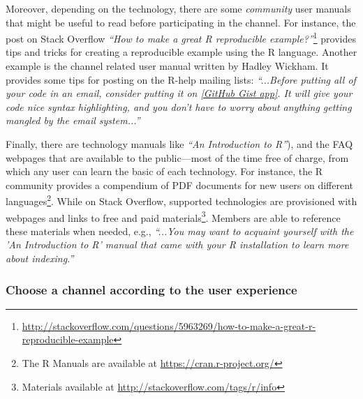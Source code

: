 \documentclass{sig-alternate-05-2015}
\begin{document}
		Moreover, depending on the technology, there are some \textit{community} user manuals that might be useful to read before participating in the channel.
		For instance, the post on Stack Overflow \textit{``How to make a great R reproducible example?''}\footnote{\url{http://stackoverflow.com/questions/5963269/how-to-make-a-great-r-reproducible-example}} provides tips and tricks for creating a reproducible example using the R language.
	 	Another example is the channel related user manual written by Hadley Wickham.
	 	It provides some tips for posting on the R-help mailing lists: \textit{``...Before putting all of your code in an email, consider putting it on \href{http://gist.github.com/}{[GitHub Gist app]}. It will give your code nice syntax highlighting, and you don't have to worry about anything getting mangled by the email system...''}

		Finally, there are technology manuals like \textit{``An Introduction to R''}), and the FAQ webpages that are available to the public---most of the time free of charge, from which any user can learn the basic of each technology.
		For instance, the R community provides a compendium of PDF documents for new users on different languages\footnote{The R Manuals are available at \url{https://cran.r-project.org/}}.
		While on Stack Overflow, supported technologies are provisioned with webpages and links to free and paid materials\footnote{Materials available at \url{http://stackoverflow.com/tags/r/info}}.
		Members are able to reference these materials when needed, e.g., \textit{``...You may want to acquaint yourself with the 'An Introduction to R' manual that came with your R installation to learn more about indexing.''}


	\subsubsection{Choose a channel according to the user experience}
\end{document}
